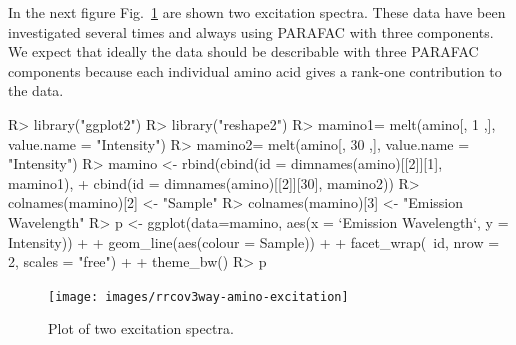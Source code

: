 \documentclass[article,shortnames, nojss]{jss}
\begin{document}
In the next figure Fig.~\ref{fig-amino-excitation} are shown two excitation spectra.
These data have been investigated several times and always using PARAFAC with
three components. We expect that ideally the data should be describable with
three PARAFAC components because each individual amino acid gives a rank-one
contribution to the data.
\begin{Schunk}
\begin{Sinput}
R> library("ggplot2")
R> library("reshape2")
R> mamino1= melt(amino[, 1 ,], value.name = "Intensity")
R> mamino2= melt(amino[, 30 ,], value.name = "Intensity")
R> mamino <- rbind(cbind(id = dimnames(amino)[[2]][1], mamino1),
+      cbind(id = dimnames(amino)[[2]][30], mamino2))
R> colnames(mamino)[2] <- "Sample"
R> colnames(mamino)[3] <- "Emission Wavelength"
R> p <- ggplot(data=mamino, aes(x = `Emission Wavelength`, y = Intensity)) +
+      geom_line(aes(colour = Sample)) +
+      facet_wrap(~id, nrow = 2, scales = "free") +
+  theme_bw()
R> p
\end{Sinput}
\end{Schunk}
\begin{figure}[H]
\centering
\texttt{[image: images/rrcov3way-amino-excitation]}
\caption{Plot of two excitation spectra.}
\label{fig-amino-excitation}
\end{figure}
\end{document}
